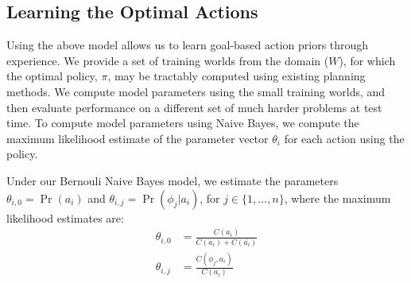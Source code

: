 \documentclass[letterpaper]{article}
\begin{document}
\subsection{Learning the Optimal Actions}
Using the above model allows us to learn goal-based action priors
through experience. We provide a set of
training worlds from the domain ($W$), for which the optimal policy,
$\pi$, may be tractably computed using existing planning methods.  We
compute model parameters using the small training worlds, and then
evaluate performance on a different set of much harder problems at
test time.  To compute model parameters using Naive Bayes, we compute
the maximum likelihood estimate of the parameter vector $\theta_i$ for
each action using the policy.

Under our Bernouli Naive Bayes model, we estimate the parameters
$\theta_{i,0} = \Pr(a_i)$ and $\theta_{i,j} = \Pr(\phi_j | a_i)$, for $j \in \{1, \ldots, n \}$, where the maximum likelihood estimates are:
\begin{align}
\theta_{i,0} &= \frac{C(a_i)}{C(a_i) + C(\bar{a_i})} \\
\theta_{i,j} &= \frac{C(\phi_j, a_i)}{C(a_i)}
\end{align}
\end{document}
